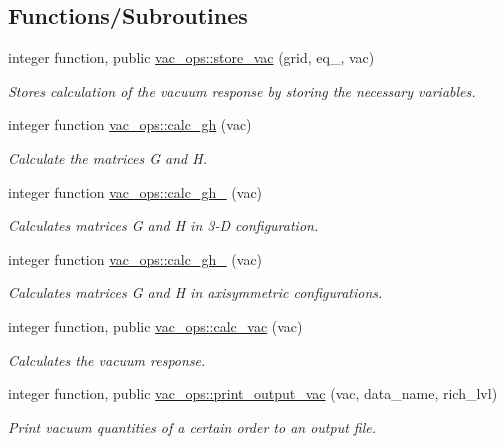 \subsection*{Functions/\+Subroutines}
\begin{DoxyCompactItemize}
\item 
integer function, public \hyperlink{namespacevac__ops_ab562fef24e579b31cdffdd9b60351c71}{vac\+\_\+ops\+::store\+\_\+vac} (grid, eq\+\_, vac)
\begin{DoxyCompactList}\small\item\em Stores calculation of the vacuum response by storing the necessary variables. \end{DoxyCompactList}\item 
integer function \hyperlink{namespacevac__ops_a4937d8dc73b1673937957507f8be0638}{vac\+\_\+ops\+::calc\+\_\+gh} (vac)
\begin{DoxyCompactList}\small\item\em Calculate the matrices {\ttfamily G} and {\ttfamily H}. \end{DoxyCompactList}\item 
integer function \hyperlink{namespacevac__ops_a95e28ef321b64104e0ec46a1f1bf70b3}{vac\+\_\+ops\+::calc\+\_\+gh\+\_} (vac)
\begin{DoxyCompactList}\small\item\em Calculates matrices {\ttfamily G} and {\ttfamily H} in 3-\/D configuration. \end{DoxyCompactList}\item 
integer function \hyperlink{namespacevac__ops_a401123f67daed9f575ab9dc5ed80b600}{vac\+\_\+ops\+::calc\+\_\+gh\+\_} (vac)
\begin{DoxyCompactList}\small\item\em Calculates matrices {\ttfamily G} and {\ttfamily H} in axisymmetric configurations. \end{DoxyCompactList}\item 
integer function, public \hyperlink{namespacevac__ops_a2dab7cc786cfffeaf2668bb50d7e0ec0}{vac\+\_\+ops\+::calc\+\_\+vac} (vac)
\begin{DoxyCompactList}\small\item\em Calculates the vacuum response. \end{DoxyCompactList}\item 
integer function, public \hyperlink{namespacevac__ops_af625d02181040db970e502644d04077e}{vac\+\_\+ops\+::print\+\_\+output\+\_\+vac} (vac, data\+\_\+name, rich\+\_\+lvl)
\begin{DoxyCompactList}\small\item\em Print vacuum quantities of a certain order to an output file. \end{DoxyCompactList}\end{DoxyCompactItemize}
